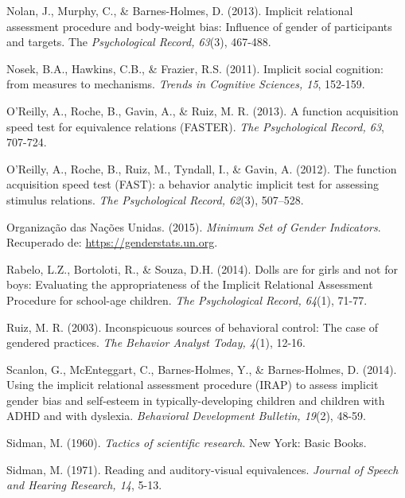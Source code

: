 \hangindent=25pt
\noindent Nolan, J., Murphy, C., \& Barnes-Holmes, D. (2013). Implicit relational assessment procedure and body-weight bias: Influence of gender of participants and targets. The \textit{Psychological Record, 63}(3), 467-488.

\hangindent=25pt
\noindent Nosek, B.A., Hawkins, C.B., \& Frazier, R.S. (2011). Implicit social cognition: from measures to mechanisms. \textit{Trends in Cognitive Sciences, 15}, 152-159.

\hangindent=25pt
\noindent O'Reilly, A., Roche, B., Gavin, A., \& Ruiz, M. R. (2013). A function acquisition speed test for equivalence relations (FASTER). \textit{The Psychological Record, 63}, 707-724.

\hangindent=25pt
\noindent O'Reilly, A., Roche, B., Ruiz, M., Tyndall, I., \& Gavin, A. (2012). The function acquisition speed test (FAST): a behavior analytic implicit test for assessing stimulus relations. \textit{The Psychological Record, 62}(3), 507–528.

\hangindent=25pt
\noindent Organização das Nações Unidas. (2015). \textit{Minimum Set of Gender Indicators}. Recuperado de: \url{https://genderstats.un.org}.

\hangindent=25pt
\noindent Rabelo, L.Z., Bortoloti, R., \& Souza, D.H. (2014). Dolls are for girls and not for boys: Evaluating the appropriateness of the Implicit Relational Assessment Procedure for school-age children. \textit{The Psychological Record, 64}(1), 71-77.

\hangindent=25pt
\noindent Ruiz, M. R. (2003). Inconspicuous sources of behavioral control: The case of gendered practices. \textit{The Behavior Analyst Today, 4}(1), 12-16.

\hangindent=25pt
\noindent Scanlon, G., McEnteggart, C., Barnes-Holmes, Y., \& Barnes-Holmes, D. (2014). Using the implicit relational assessment procedure (IRAP) to assess implicit gender bias and self-esteem in typically-devel\-oping children and children with ADHD and with dyslexia. \textit{Behavioral Development Bulletin, 19}(2), 48-59.

\hangindent=25pt
\noindent Sidman, M. (1960). \textit{Tactics of scientific research}. New York: Basic Books.

\hangindent=25pt
\noindent Sidman, M. (1971). Reading and auditory-visual equivalences. \textit{Journal of Speech and Hearing Research, 14}, 5-13.

